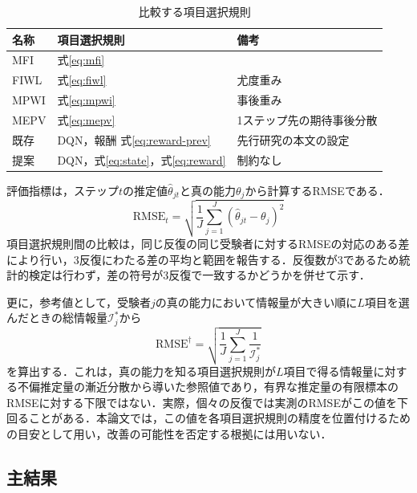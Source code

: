\documentclass[paper]{ieicej}
\begin{document}
\begin{table}[t]
\centering
\caption{比較する項目選択規則}
\label{tab:methods}
\footnotesize
\setlength{\tabcolsep}{2pt}
\begin{tabular}{lll}
\hline
名称 & 項目選択規則 & 備考\\
\hline
MFI & 式\eqref{eq:mfi} & \\
FIWL & 式\eqref{eq:fiwl} & 尤度重み\\
MPWI & 式\eqref{eq:mpwi} & 事後重み\\
MEPV & 式\eqref{eq:mepv} & 1ステップ先の期待事後分散\\
既存 & DQN，報酬 式\eqref{eq:reward-prev} & 先行研究の本文の設定\\
提案 & DQN，式\eqref{eq:state}，式\eqref{eq:reward} & 制約なし\\
\hline
\end{tabular}
\end{table}

評価指標は，ステップ$t$の推定値$\hat\theta_{jt}$と真の能力$\theta_j$から計算するRMSEである．
\begin{equation}
 \mathrm{RMSE}_t=\sqrt{\frac{1}{J}\sum_{j=1}^{J}(\hat\theta_{jt}-\theta_j)^2}
 \label{eq:metrics}
\end{equation}
項目選択規則間の比較は，同じ反復の同じ受験者に対するRMSEの対応のある差により行い，3反復にわたる差の平均と範囲を報告する．反復数が3であるため統計的検定は行わず，差の符号が3反復で一致するかどうかを併せて示す．

更に，参考値として，受験者$j$の真の能力において情報量が大きい順に$L$項目を選んだときの総情報量$\mathcal{I}^*_j$から
\begin{equation}
 \mathrm{RMSE}^\dagger=\sqrt{\frac{1}{J}\sum_{j=1}^{J}\frac{1}{\mathcal{I}^*_j}}
 \label{eq:reference}
\end{equation}
を算出する．これは，真の能力を知る項目選択規則が$L$項目で得る情報量に対する不偏推定量の漸近分散から導いた参照値であり，有界な推定量の有限標本のRMSEに対する下限ではない．実際，個々の反復では実測のRMSEがこの値を下回ることがある．本論文では，この値を各項目選択規則の精度を位置付けるための目安として用い，改善の可能性を否定する根拠には用いない．

\subsection{主結果}\label{sec:expresult}
\end{document}
